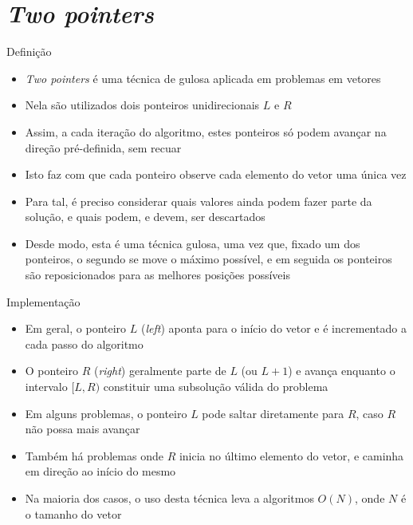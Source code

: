 \section{\it Two pointers}

\begin{frame}[fragile]{Definição}

    \begin{itemize}
        \item \textit{Two pointers} é uma técnica de gulosa aplicada em problemas em
            vetores

        \item Nela são utilizados dois ponteiros unidirecionais $L$ e $R$

        \item Assim, a cada iteração do algoritmo, estes ponteiros só podem avançar na direção
            pré-definida, sem recuar

        \item Isto faz com que cada ponteiro observe cada elemento do vetor uma única vez

        \item Para tal, é preciso considerar quais valores ainda podem fazer parte da solução,
            e quais podem, e devem, ser descartados

        \item Desde modo, esta é uma técnica gulosa, uma vez que, fixado um dos ponteiros, o
            segundo se move o máximo possível, e em seguida os ponteiros são reposicionados para
            as melhores posições possíveis

    \end{itemize}

\end{frame}

\begin{frame}[fragile]{Implementação}

    \begin{itemize}
        \item Em geral, o ponteiro $L$ (\textit{left}) aponta para o início do vetor e é
            incrementado a cada passo do algoritmo

        \item O ponteiro $R$ (\textit{right}) geralmente parte de $L$ (ou $L + 1$) e avança
            enquanto o intervalo $[L, R)$ constituir uma subsolução válida do problema

        \item Em alguns problemas, o ponteiro $L$ pode saltar diretamente para $R$, caso $R$ não
            possa mais avançar

        \item Também há problemas onde $R$ inicia no último elemento do vetor, e caminha em direção
            ao início do mesmo

        \item Na maioria dos casos, o uso desta técnica leva a algoritmos $O(N)$, onde $N$ é o tamanho
            do vetor
    \end{itemize}

\end{frame}
